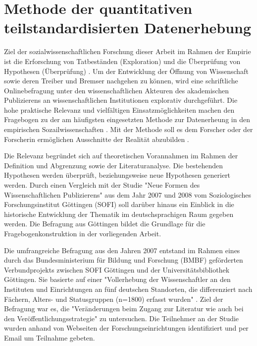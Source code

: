 \section{Methode der quantitativen teilstandardisierten Datenerhebung}

Ziel der sozialwissenschaftlichen Forschung dieser Arbeit im Rahmen der Empirie ist die Erforschung von Tatbeständen (Exploration) und die Überprüfung von Hypothesen (Überprüfung) \cite{raab_2012_fragebogen}. Um der Entwicklung der Öffnung von Wissenschaft sowie deren Treiber und Bremser nachgehen zu können, wird eine schriftliche Onlinebefragung unter den wissenschaftlichen Akteuren des akademischen Publizierens an wissenschaftlichen Institutionen explorativ durchgeführt. Die hohe praktische Relevanz und vielfältigen Einsatzmöglichkeiten machen den Fragebogen zu der am häufigsten eingesetzten Methode zur Datenerheung in den empirischen Sozailwissenschaften \cite{raab_2012_fragebogen}. Mit der Methode soll es dem Forscher oder der Forscherin ermöglichen Ausschnitte der Realität abzubilden \cite{raab_2012_fragebogen}.

Die Relevanz begründet sich auf theoretischen Vorannahmen im Rahmen der Definition und Abgrenzung sowie der Literaturanalyse. Die bestehenden Hypothesen werden überprüft, beziehungsweise neue Hypothesen generiert werden. Durch einen Vergleich mit der Studie "Neue Formen des Wissenschaftlichen Publizierens" aus dem Jahr 2007 und 2008 vom Soziologisches Forschungsinstitut Göttingen (SOFI) soll darüber hinaus ein Einblick in die historische Entwicklung der Thematik im deutschsprachigen Raum gegeben werden. Die Befragung aus Göttingen bildet die Grundlage für die Fragebogenkonstruktion in der vorliegenden Arbeit. 

Die umfrangreiche Befragung aus den Jahren 2007 entstand im Rahmen eines durch das Bundesministerium für Bildung und Forschung (BMBF) geförderten Verbundprojekts zwischen SOFI Göttingen und der Universitätsbibliothek Göttingen. Sie basierte auf einer "Vollerhebung der Wissenschaftler an den Instituten und Einrichtungen an fünf deutschen Standorten, die differenziert nach Fächern, Alters- und Statusgruppen (n=1800) erfasst wurden" \cite{Hanekop_2014}. Ziel der Befragung war es, die "Veränderungen beim Zugang zur Literatur wie auch bei den Veröffentlichungsstrategie" \cite{Hanekop_Wittke_2007_Fragebogen} zu untersuchen. Die Teilnehmer an der Studie wurden anhand von Webseiten der Forschungseinrichtungen identifiziert und per Email um Teilnahme gebeten. 

